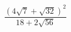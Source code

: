 \begin{ex}[type=calculate]
	\begin{condition}
		\( \dfrac{(4\sqrt{7}+\sqrt{32})^2}{18+2\sqrt{56}} \)
	\end{condition}
\end{ex}